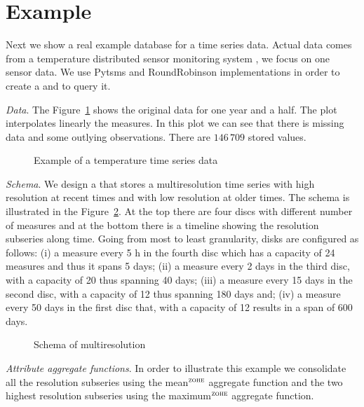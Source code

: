 \section{Example}
\label{sec:example}


Next we show a real example database for a time series data. Actual
data comes from a temperature distributed sensor monitoring system
\cite{alippi10}, we focus on one sensor data. We use Pytsms and
RoundRobinson implementations in order to create a  and
to query it.

\emph{Data}. The Figure~\ref{fig:exemple:original} shows the original
data for one year and a half. The plot interpolates linearly the
measures. In this plot we can see that there is missing data and some
outlying observations. There are $146\,709$ stored values.

\begin{figure}[tp]
  \centering
  
  \caption{Example of a temperature time series data}
  \label{fig:exemple:original}
\end{figure}

\emph{Schema}. We design a  that stores a multiresolution
time series with high resolution at recent times and with low
resolution at older times. The schema is illustrated in the
Figure~\ref{fig:exemple:window}. At the top there are four discs with
different number of measures and at the bottom there is a timeline
showing the resolution subseries along time. Going from most to least
granularity, disks are configured as follows: (i) a measure every 5 h
in the fourth disc which has a capacity of 24 measures and thus it
spans 5 days; (ii) a measure every 2 days in the third disc, with a
capacity of 20 thus spanning 40 days; (iii) a measure every 15 days in
the second disc, with a capacity of 12 thus spanning 180 days and;
(iv) a measure every 50 days in the first disc that, with a capacity
of 12 results in a span of 600 days.

\begin{figure}[tp]
  \centering
  \setlength{\unitlength}{1.3mm}
  
  \caption{Schema of multiresolution}
  \label{fig:exemple:window}
\end{figure}

\emph{Attribute aggregate functions}.  In order to illustrate this
example we consolidate all the resolution subseries using the
mean$^\zohe{}$ aggregate function and the two highest resolution
subseries using the maximum$^\zohe{}$ aggregate function. 



